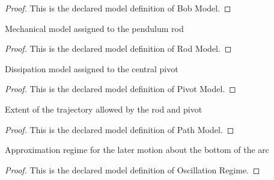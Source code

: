 \begin{proof}
  This is the declared model definition of Bob Model.
\end{proof}
\begin{definition}
  \label{def:physics:phyx-mini-0719:phyxminiproblems-problemphyxmini0719-rodmodel}
  Mechanical model assigned to the pendulum rod
\end{definition}
\begin{proof}
  This is the declared model definition of Rod Model.
\end{proof}
\begin{definition}
  \label{def:physics:phyx-mini-0719:phyxminiproblems-problemphyxmini0719-pivotmodel}
  Dissipation model assigned to the central pivot
\end{definition}
\begin{proof}
  This is the declared model definition of Pivot Model.
\end{proof}
\begin{definition}
  \label{def:physics:phyx-mini-0719:phyxminiproblems-problemphyxmini0719-pathmodel}
  Extent of the trajectory allowed by the rod and pivot
\end{definition}
\begin{proof}
  This is the declared model definition of Path Model.
\end{proof}
\begin{definition}
  \label{def:physics:phyx-mini-0719:phyxminiproblems-problemphyxmini0719-oscillationregime}
  Approximation regime for the later motion about the bottom of the arc
\end{definition}
\begin{proof}
  This is the declared model definition of Oscillation Regime.
\end{proof}
